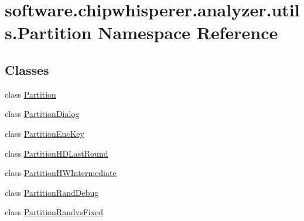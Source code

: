 \hypertarget{namespacesoftware_1_1chipwhisperer_1_1analyzer_1_1utils_1_1Partition}{}\section{software.\+chipwhisperer.\+analyzer.\+utils.\+Partition Namespace Reference}
\label{namespacesoftware_1_1chipwhisperer_1_1analyzer_1_1utils_1_1Partition}
\subsection*{Classes}
\begin{DoxyCompactItemize}
\item 
class \hyperlink{classsoftware_1_1chipwhisperer_1_1analyzer_1_1utils_1_1Partition_1_1Partition}{Partition}
\item 
class \hyperlink{classsoftware_1_1chipwhisperer_1_1analyzer_1_1utils_1_1Partition_1_1PartitionDialog}{Partition\+Dialog}
\item 
class \hyperlink{classsoftware_1_1chipwhisperer_1_1analyzer_1_1utils_1_1Partition_1_1PartitionEncKey}{Partition\+Enc\+Key}
\item 
class \hyperlink{classsoftware_1_1chipwhisperer_1_1analyzer_1_1utils_1_1Partition_1_1PartitionHDLastRound}{Partition\+H\+D\+Last\+Round}
\item 
class \hyperlink{classsoftware_1_1chipwhisperer_1_1analyzer_1_1utils_1_1Partition_1_1PartitionHWIntermediate}{Partition\+H\+W\+Intermediate}
\item 
class \hyperlink{classsoftware_1_1chipwhisperer_1_1analyzer_1_1utils_1_1Partition_1_1PartitionRandDebug}{Partition\+Rand\+Debug}
\item 
class \hyperlink{classsoftware_1_1chipwhisperer_1_1analyzer_1_1utils_1_1Partition_1_1PartitionRandvsFixed}{Partition\+Randvs\+Fixed}
\end{DoxyCompactItemize}
